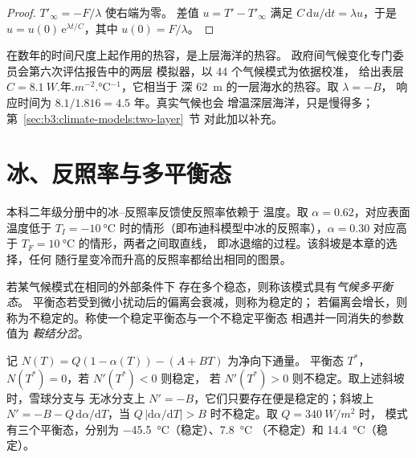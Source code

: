 \begin{proof}
$T'_\infty = -F/\lambda$ 使右端为零。
差值 $u = T' - T'_\infty$ 满足 $C\,\mathrm du/\mathrm dt = \lambda u$，于是 $u =
u(0)\,\mathrm e^{\lambda t/C}$，其中 $u(0) = F/\lambda$。
\end{proof}

在数年的时间尺度上起作用的热容，是上层海洋的热容。
政府间气候变化专门委员会第六次评估报告中的两层
模拟器，以 44 个气候模式为依据校准，
给出表层 $C = \qty{8.1}{W.\text{年}.m^{-2}.\celsius^{-1}}$，它相当于
深 \qty{62}{m} 的一层海水的热容。取 $\lambda = -B$，
响应时间为 $8.1/1.816 = \num{4.5}\text{ 年}$。真实气候也会
增温深层海洋，只是慢得多；第~\ref{sec:b3:climate-models:two-layer}~节
对此加以补充。

\section{冰、反照率与多平衡态}\label{sec:b3:climate-models:multiple}

本科二年级分册中的冰–反照率反馈使反照率依赖于
温度。取 $\alpha = 0.62$，对应表面温度低于
$T_I = \qty{-10}{\celsius}$ 时的情形（即布迪科模型中冰的反照率），$\alpha
= 0.30$ 对应高于 $T_F = \qty{+10}{\celsius}$ 的情形，两者之间取直线，
即冰退缩的过程。该斜坡是本章的选择，任何
随行星变冷而升高的反照率都给出相同的图景。

\begin{definition}\label{def:b3:climate-models:multiple-equilibria}
若某气候模式在相同的外部条件下
存在多个稳态，则称该模式具有\emph{气候多平衡态}。
平衡态若受到微小扰动后的偏离会衰减，则称为稳定的；
若偏离会增长，则称为不稳定的。称使一个稳定平衡态与一个不稳定平衡态
相遇并一同消失的参数值为
\emph{鞍结分岔}。
\end{definition}

\begin{proposition}[三个平衡态及其稳定性]\label{prop:b3:climate-models:three}
记 $N(T) = Q(1 - \alpha(T)) - (A + BT)$ 为净向下通量。
平衡态 $T^*$，$N(T^*) = 0$，若 $N'(T^*) < 0$ 则稳定，
若 $N'(T^*) > 0$ 则不稳定。取上述斜坡时，雪球分支与
无冰分支上 $N' = -B$，它们只要存在便是稳定的；斜坡上 $N' = -B -
Q\,\mathrm d\alpha/\mathrm dT$，当 $Q\,
|\mathrm d\alpha/\mathrm dT| > B$ 时不稳定。取 $Q = \qty{340}{W/m^2}$ 时，
模式有三个平衡态，分别为 \qty{-45.5}{\celsius}（稳定）、\qty{7.8}{\celsius}
（不稳定）和 \qty{14.4}{\celsius}（稳定）。
\end{proposition}

